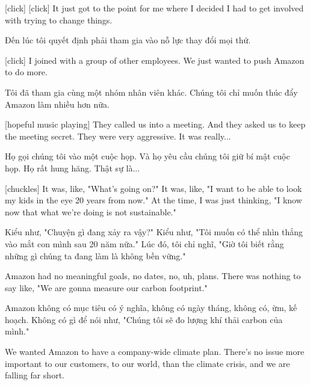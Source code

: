 \documentclass[a4paper]{article}
\begin{document}
	[click]
	[click]
	It just got to the point for me where I decided I had to get involved with trying to change things.
	
	\begin{vietnamese-v2}
		[click]
		[click]
		Đến lúc tôi quyết định phải tham gia vào nỗ lực thay đổi mọi thứ.
	\end{vietnamese-v2}
	
	[click]
	I joined with a group of other employees.
	We just wanted to push Amazon to do more.
	
	\begin{vietnamese-v2}
		[click]
		Tôi đã tham gia cùng một nhóm nhân viên khác.
		Chúng tôi chỉ muốn thúc đẩy Amazon làm nhiều hơn nữa.
	\end{vietnamese-v2}
	
	[hopeful music playing]
	They called us into a meeting.
	And they asked us to keep the meeting secret.
	They were very aggressive. It was really...
	
	\begin{vietnamese-v2}
		Họ gọi chúng tôi vào một cuộc họp.
		Và họ yêu cầu chúng tôi giữ bí mật cuộc họp.
		Họ rất hung hăng. Thật sự là...
	\end{vietnamese-v2}
	
	[chuckles] It was, like, "What's going on?"
	It was, like, "I want to be able to look my kids in the eye 20 years from now."
	At the time, I was just thinking, "I know now that what we're doing is not sustainable."
	
	\begin{vietnamese-v2}
		 Kiểu như, "Chuyện gì đang xảy ra vậy?"
		Kiểu như, "Tôi muốn có thể nhìn thẳng vào mắt con mình sau 20 năm nữa."
		Lúc đó, tôi chỉ nghĩ, "Giờ tôi biết rằng những gì chúng ta đang làm là không bền vững."
	\end{vietnamese-v2}
	
	Amazon had no meaningful goals, no dates, no, uh, plans.
	There was nothing to say like, "We are gonna measure our carbon footprint."
	
	\begin{vietnamese-v2}
		Amazon không có mục tiêu có ý nghĩa, không có ngày tháng, không có, ừm, kế hoạch.
		Không có gì để nói như, "Chúng tôi sẽ đo lượng khí thải carbon của mình."
	\end{vietnamese-v2}
	
	We wanted Amazon to have a company-wide climate plan.
	There's no issue more important to our customers, to our world, than the climate crisis, and we are falling far short.
	
\end{document}

